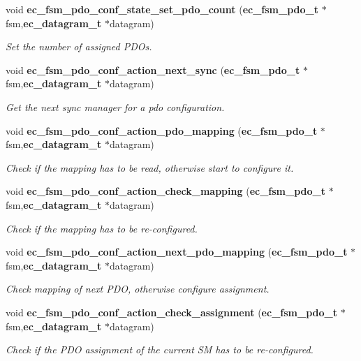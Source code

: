 \begin{DoxyCompactItemize}
void {\bf ec\-\_\-fsm\-\_\-pdo\-\_\-conf\-\_\-state\-\_\-set\-\_\-pdo\-\_\-count} ({\bf ec\-\_\-fsm\-\_\-pdo\-\_\-t} $\ast$fsm,{\bf ec\-\_\-datagram\-\_\-t} $\ast$datagram)
\begin{DoxyCompactList}\small\item\em \-Set the number of assigned \-P\-D\-Os. \end{DoxyCompactList}\item 
void {\bf ec\-\_\-fsm\-\_\-pdo\-\_\-conf\-\_\-action\-\_\-next\-\_\-sync} ({\bf ec\-\_\-fsm\-\_\-pdo\-\_\-t} $\ast$fsm,{\bf ec\-\_\-datagram\-\_\-t} $\ast$datagram)
\begin{DoxyCompactList}\small\item\em \-Get the next sync manager for a pdo configuration. \end{DoxyCompactList}\item 
void {\bf ec\-\_\-fsm\-\_\-pdo\-\_\-conf\-\_\-action\-\_\-pdo\-\_\-mapping} ({\bf ec\-\_\-fsm\-\_\-pdo\-\_\-t} $\ast$fsm,{\bf ec\-\_\-datagram\-\_\-t} $\ast$datagram)
\begin{DoxyCompactList}\small\item\em \-Check if the mapping has to be read, otherwise start to configure it. \end{DoxyCompactList}\item 
void {\bf ec\-\_\-fsm\-\_\-pdo\-\_\-conf\-\_\-action\-\_\-check\-\_\-mapping} ({\bf ec\-\_\-fsm\-\_\-pdo\-\_\-t} $\ast$fsm,{\bf ec\-\_\-datagram\-\_\-t} $\ast$datagram)
\begin{DoxyCompactList}\small\item\em \-Check if the mapping has to be re-\/configured. \end{DoxyCompactList}\item 
void {\bf ec\-\_\-fsm\-\_\-pdo\-\_\-conf\-\_\-action\-\_\-next\-\_\-pdo\-\_\-mapping} ({\bf ec\-\_\-fsm\-\_\-pdo\-\_\-t} $\ast$fsm,{\bf ec\-\_\-datagram\-\_\-t} $\ast$datagram)
\begin{DoxyCompactList}\small\item\em \-Check mapping of next \-P\-D\-O, otherwise configure assignment. \end{DoxyCompactList}\item 
void {\bf ec\-\_\-fsm\-\_\-pdo\-\_\-conf\-\_\-action\-\_\-check\-\_\-assignment} ({\bf ec\-\_\-fsm\-\_\-pdo\-\_\-t} $\ast$fsm,{\bf ec\-\_\-datagram\-\_\-t} $\ast$datagram)
\begin{DoxyCompactList}\small\item\em \-Check if the \-P\-D\-O assignment of the current \-S\-M has to be re-\/configured. \end{DoxyCompactList}\item 

\end{DoxyCompactItemize}
